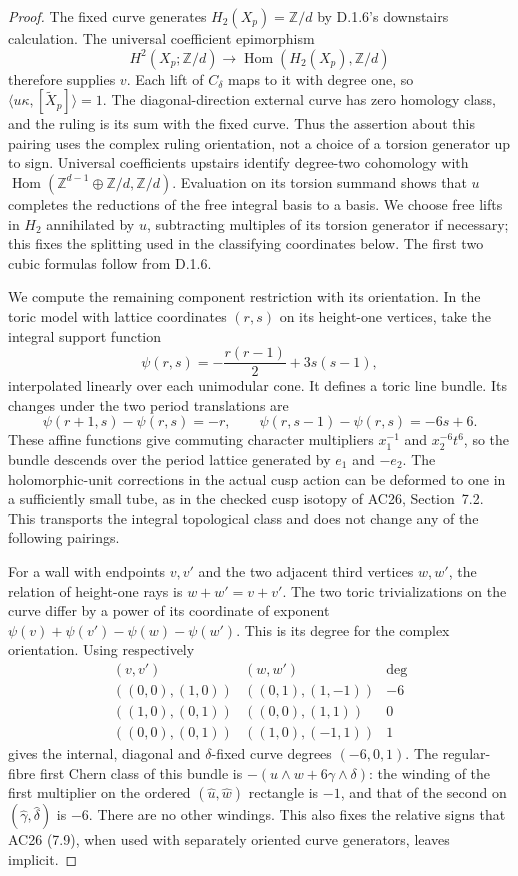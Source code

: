 \begin{proof}
The fixed curve generates $H_2(X_p)=\mathbb Z/d$ by D.1.6's
downstairs calculation. The universal coefficient epimorphism
\[
 H^2(X_p;\mathbb Z/d)\longrightarrow
 \operatorname{Hom}(H_2(X_p),\mathbb Z/d)
\]
therefore supplies $v$. Each lift of $C_\delta$ maps to it with
degree one, so $\langle u\kappa,[\widetilde X_p]\rangle=1$.
The diagonal-direction external curve has zero homology class,
and the ruling is its sum with the fixed curve. Thus the assertion
about this pairing uses the complex ruling orientation, not a
choice of a torsion generator up to sign. Universal coefficients
upstairs identify degree-two cohomology with
$\operatorname{Hom}(\mathbb Z^{d-1}\oplus\mathbb Z/d,\mathbb Z/d)$.
Evaluation on its torsion summand shows that $u$ completes the
reductions of the free integral basis to a basis. We choose free
lifts in $H_2$ annihilated by $u$, subtracting multiples of its
torsion generator if necessary; this fixes the splitting used in
the classifying coordinates below. The first two
cubic formulas follow from D.1.6.

We compute the remaining component restriction with its orientation.
In the toric model with lattice coordinates $(r,s)$ on its height-one
vertices, take the integral support function
\[
 \psi(r,s)=-\frac{r(r-1)}2+3s(s-1),
\]
interpolated linearly over each unimodular cone. It defines a toric
line bundle. Its changes under the two period translations are
\[
 \psi(r+1,s)-\psi(r,s)=-r,
 \qquad
 \psi(r,s-1)-\psi(r,s)=-6s+6.
\]
These affine functions give commuting character multipliers
$x_1^{-1}$ and $x_2^{-6}t^6$, so the bundle descends over the
period lattice generated by $e_1$ and $-e_2$. The holomorphic-unit
corrections in the actual cusp action can be deformed to one in a
sufficiently small tube, as in the checked cusp isotopy of AC26,
Section~7.2. This transports the integral topological class and
does not change any of the following pairings.

For a wall with endpoints $v,v'$ and the two adjacent third vertices
$w,w'$, the relation of height-one rays is $w+w'=v+v'$.
The two toric trivializations on the curve differ by a power of its
coordinate of exponent
$\psi(v)+\psi(v')-\psi(w)-\psi(w')$. This is its degree for the
complex orientation. Using respectively
\[
 \begin{array}{c|c|c}
 (v,v')&(w,w')&\deg\\\hline
 ((0,0),(1,0))&((0,1),(1,-1))&-6\\
 ((1,0),(0,1))&((0,0),(1,1))&0\\
 ((0,0),(0,1))&((1,0),(-1,1))&1
 \end{array}
\]
gives the internal, diagonal and $\delta$-fixed curve degrees
$(-6,0,1)$. The regular-fibre first Chern class of this bundle is
$-(u\wedge w+6\gamma\wedge\delta)$: the winding of the first
multiplier on the ordered $(\widehat u,\widehat w)$ rectangle is
$-1$, and that of the second on
$(\widehat\gamma,\widehat\delta)$ is $-6$.
There are no other windings. This also fixes the relative signs
that AC26 (7.9), when used with separately oriented curve generators,
leaves implicit.


\end{proof}
